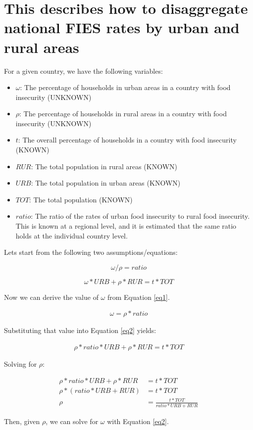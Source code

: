 \documentclass[10pt]{article}         %
\begin{document}
\section*{This describes how to disaggregate national FIES rates by urban and rural areas}

For a given country, we have the following variables:

\begin{itemize}
 \item $\omega$: The percentage of households in urban areas in a country with food insecurity (UNKNOWN)
 
 \item $\rho$: The percentage of households in rural areas in a country with food insecurity (UNKNOWN)
 
 \item $t$: The overall percentage of households in a country with food insecurity (KNOWN)
 
 \item $RUR$: The total population in rural areas (KNOWN)
 
 \item $URB$: The total population in urban areas (KNOWN)
 
 \item $TOT$: The total population (KNOWN)
 
 \item $ratio$: The ratio of the rates of urban food insecurity to rural food insecurity.  This is known at a regional level, and it is estimated that the same ratio holds at the individual country level.
\end{itemize}

Lets start from the following two assumptions/equations:

\begin{equation} 
	\omega / \rho = ratio 
	\label{eq1}
\end{equation}

\begin{equation} 
	\omega * URB + \rho * RUR = t * TOT
	\label{eq2}
\end{equation}
\newline
 
Now we can derive the value of $\omega$ from Equation \ref{eq1}.

\begin{gather*} 
\omega = \rho * ratio                   
\end{gather*}

Substituting that value into Equation \ref{eq2} yields:

\begin{gather*} 
\rho * ratio * URB + \rho * RUR = t * TOT                
\end{gather*}

Solving for $\rho$:

\begin{align*}
\rho * ratio * URB + \rho * RUR &= t * TOT     \\
\rho * (ratio * URB + RUR) &= t * TOT \\
\rho &= \frac{t * TOT}{ratio * URB + RUR}
\end{align*}

Then, given $\rho$, we can solve for $\omega$ with Equation \ref{eq2}.
 
\end{document}
